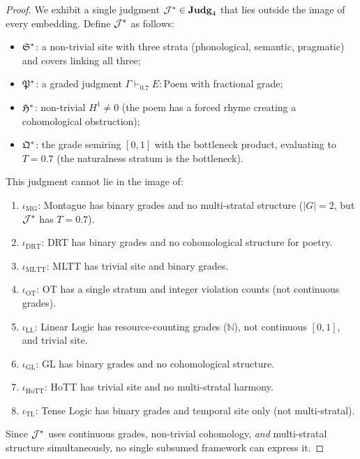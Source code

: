 \begin{proof}
We exhibit a single judgment $\mathcal{J}^* \in \mathbf{Judg}_4$ that lies
outside the image of every embedding.  Define $\mathcal{J}^*$ as follows:
\begin{itemize}[nosep]
\item $\mathfrak{S}^*$: a non-trivial site with three strata
  (phonological, semantic, pragmatic) and covers linking all three;
\item $\mathfrak{P}^*$: a graded judgment
  $\Gamma \vdash_{0.7} E : \mathrm{Poem}$ with fractional grade;
\item $\mathfrak{H}^*$: non-trivial $H^1 \neq 0$ (the poem has a forced
  rhyme creating a cohomological obstruction);
\item $\mathfrak{Q}^*$: the grade semiring $[0,1]$ with the bottleneck
  product, evaluating to $T = 0.7$ (the naturalness stratum is the
  bottleneck).
\end{itemize}

This judgment cannot lie in the image of:
\begin{enumerate}[label=(\roman*),nosep]
\item $\iota_{\mathrm{MG}}$: Montague has binary grades and no
  multi-stratal structure ($|G| = 2$, but $\mathcal{J}^*$ has $T = 0.7$).
\item $\iota_{\mathrm{DRT}}$: DRT has binary grades and no
  cohomological structure for poetry.
\item $\iota_{\mathrm{MLTT}}$: MLTT has trivial site and binary
  grades.
\item $\iota_{\mathrm{OT}}$: OT has a single stratum and integer
  violation counts (not continuous grades).
\item $\iota_{\mathrm{LL}}$: Linear Logic has resource-counting
  grades ($\mathbb{N}$), not continuous $[0,1]$, and trivial site.
\item $\iota_{\mathrm{GL}}$: GL has binary grades and no
  cohomological structure.
\item $\iota_{\mathrm{HoTT}}$: HoTT has trivial site and no
  multi-stratal harmony.
\item $\iota_{\mathrm{TL}}$: Tense Logic has binary grades and
  temporal site only (not multi-stratal).
\end{enumerate}
Since $\mathcal{J}^*$ uses continuous grades, non-trivial cohomology,
\emph{and} multi-stratal structure simultaneously, no single
subsumed framework can express it.
\end{proof}

